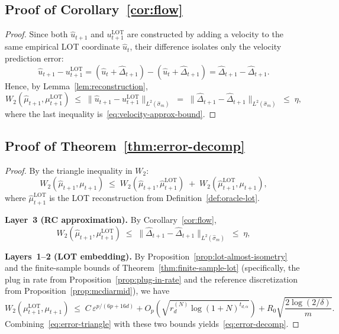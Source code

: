 \documentclass[11pt]{article}
\newcommand{\1}{\mathbf{1}}
\begin{document}
\subsection{Proof of Corollary~\ref{cor:flow}}
\label{app:proof-flow}
\begin{proof}
Since both $\widehat{u}_{t+1}$ and $u_{t+1}^{\mathrm{LOT}}$ are
constructed by adding a velocity to the same empirical LOT coordinate
$\hat{u}_t$, their difference isolates only the velocity prediction error:
\[
  \widehat{u}_{t+1} - u_{t+1}^{\mathrm{LOT}}
  = (\hat{u}_t + \widehat{\Delta}_{t+1}) - (\hat{u}_t + \hat{\Delta}_{t+1})
  = \widehat{\Delta}_{t+1} - \hat{\Delta}_{t+1}.
\]
Hence, by Lemma~\ref{lem:reconstruction},
\[
  W_2(\widehat{\mu}_{t+1}, \mu_{t+1}^{\mathrm{LOT}})
  \;\leq\; \|\widehat{u}_{t+1} - u_{t+1}^{\mathrm{LOT}}\|_{L^2(\hat{\sigma}_m)}
  \;=\; \|\widehat{\Delta}_{t+1} - \hat{\Delta}_{t+1}\|_{L^2(\hat{\sigma}_m)}
  \;\leq\; \eta,
\]
where the last inequality is~\eqref{eq:velocity-approx-bound}.
\end{proof}

\subsection{Proof of Theorem~\ref{thm:error-decomp}}
\label{app:proof-error-decomp}
\begin{proof}
By the triangle inequality in $W_2$:
\begin{equation}\label{eq:error-triangle}
  W_2(\widehat{\mu}_{t+1}, \mu_{t+1})
  \;\leq\; W_2(\widehat{\mu}_{t+1}, \hat{\mu}_{t+1}^{\mathrm{LOT}})
  \;+\; W_2(\hat{\mu}_{t+1}^{\mathrm{LOT}}, \mu_{t+1}),
\end{equation}
where $\hat{\mu}_{t+1}^{\mathrm{LOT}}$ is the LOT reconstruction from Definition~\ref{def:oracle-lot}.

\textbf{Layer~3 (RC approximation).}
By Corollary~\ref{cor:flow},
\[
  W_2(\widehat{\mu}_{t+1}, \mu_{t+1}^{\mathrm{LOT}})
  \;\leq\;
  \|\widehat{\Delta}_{t+1} - \hat{\Delta}_{t+1}\|_{L^2(\hat{\sigma}_m)}
  \;\leq\; \eta,
\]

\textbf{Layers~1--2 (LOT embedding).}
By Proposition~\ref{prop:lot-almost-isometry} and the finite-sample bounds
of Theorem~\ref{thm:finite-sample-lot} (specifically, the plug in rate from Proposition~\ref{prop:plug-in-rate} and the reference discretization from Proposition~\ref{prop:mcdiarmid}), we have
\[
  W_2(\mu_{t+1}^{\mathrm{LOT}}, \mu_{t+1})
  \;\leq\;
  C\,\varepsilon^{p/(6p+16d)}
  + O_p\!\left(\sqrt{r_d^{(N)} \log(1+N)^{t_{d,\alpha}}}\right)
  + R_0\sqrt{\frac{2\log(2/\delta)}{m}}.
\]
Combining~\eqref{eq:error-triangle} with these two bounds yields~\eqref{eq:error-decomp}.
\end{proof}
\end{document}
